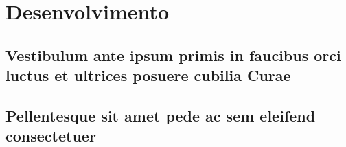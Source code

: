 
\chapter{Desenvolvimento}

\section{Vestibulum ante ipsum primis in faucibus orci luctus et ultrices
posuere cubilia Curae}

\lipsum[21-22]

\section{Pellentesque sit amet pede ac sem eleifend consectetuer}

\lipsum[24]
